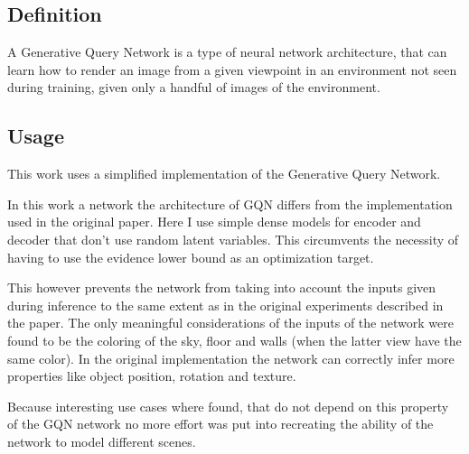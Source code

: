 \subsection{Definition}
A Generative Query Network \cite{gqn} is a type of neural network architecture, that can learn how to render an image from a given viewpoint in an environment not seen during training, given only a handful of images of the environment.

\begin{figure}
\centering
{}

\caption{}
\figsource{}
\label{}

\end{figure}



\subsection{Usage}
This work uses a simplified implementation of the Generative Query Network.

In this work a network the architecture of GQN differs from the implementation used in the original paper. Here I use simple dense models for encoder and decoder that don't use random latent variables. This circumvents the necessity of having to use the evidence lower bound as an optimization target.

This however prevents the network from taking into account the inputs given during inference to the same extent as in the original experiments described in the paper. The only meaningful considerations of the inputs of the network were found to be the coloring of the sky, floor and walls (when the latter view have the same color). In the original implementation the network can correctly infer more properties like object position, rotation and texture.

Because interesting use cases where found, that do not depend on this property of the GQN network no more effort was put into recreating the ability of the network to model different scenes.
